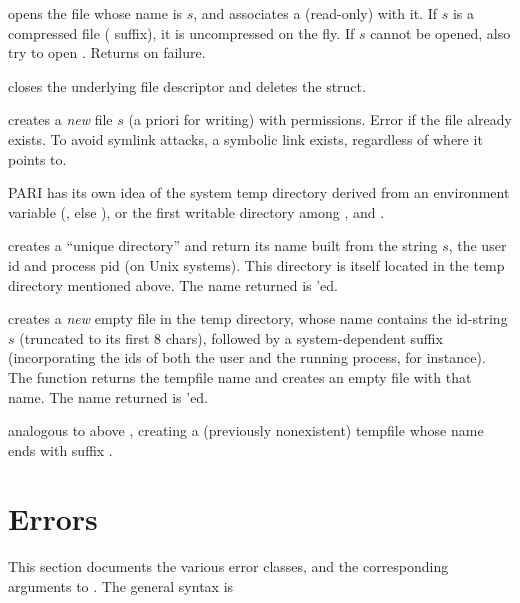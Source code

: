  opens the file whose name is
$s$,  and associates a (read-only)  with it. If $s$ is a
compressed file ( suffix), it is uncompressed on the fly.
If $s$ cannot be opened, also try to open . Returns 
on failure.

 closes
the underlying file descriptor and deletes the  struct.

creates a \emph{new} file $s$ (a priori for writing) with 
permissions. Error if the file already exists. To avoid symlink attacks,
a symbolic link exists, regardless of where it points to.


PARI has its own idea of the system temp directory derived from an
environment variable (, else ), or the first
writable directory among ,  and .

 creates a ``unique directory''
and return its name built from the string $s$, the user id and process pid
(on Unix systems). This directory is itself located in the temp
directory mentioned above. The name returned is 'ed.

 creates a \emph{new} empty
file in the temp directory, whose name contains the id-string $s$ (truncated
to its first $8$ chars), followed by a system-dependent suffix (incorporating
the ids of both the user and the running process, for instance). The function
returns the tempfile name and creates an empty file with that name. The name
returned is 'ed.

analogous to above , creating a (previously
nonexistent) tempfile whose name ends with suffix .

\section{Errors}\label{se:errors}

This section documents the various error classes, and the corresponding
arguments to . The general syntax is



